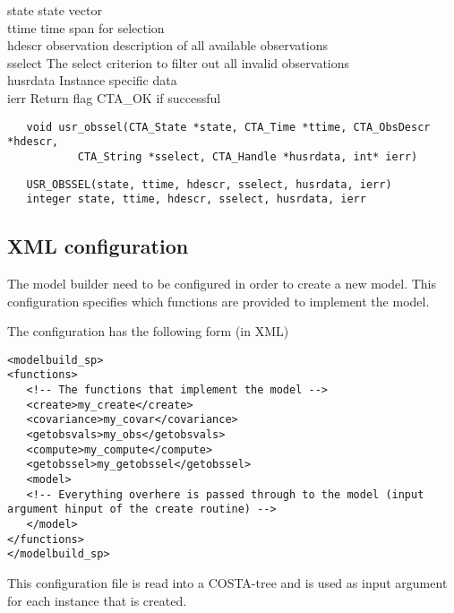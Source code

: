 \horzline
\begin{tabbing}
\functab
{}
 {state}  {state vector} \\
 {ttime}  {time span for selection} \\
 {hdescr} {observation description of all available observations}  \\
 {sselect} {The select criterion to filter out all invalid observations}\\
 {husrdata}  {Instance specific data}\\
    {ierr}      {Return flag CTA\_OK if successful}\\
\end{tabbing}
\horzline

\begin{verbatim}
   void usr_obssel(CTA_State *state, CTA_Time *ttime, CTA_ObsDescr *hdescr,
           CTA_String *sselect, CTA_Handle *husrdata, int* ierr)
\end{verbatim}

\begin{verbatim}
   USR_OBSSEL(state, ttime, hdescr, sselect, husrdata, ierr)
   integer state, ttime, hdescr, sselect, husrdata, ierr
\end{verbatim}

\subsection{XML configuration}
The model builder need to be configured in order to create a new model. This
configuration specifies which functions
are provided to implement the model.

The configuration has the following form (in XML)
\begin{verbatim}
<modelbuild_sp> 
<functions>
   <!-- The functions that implement the model -->
   <create>my_create</create>
   <covariance>my_covar</covariance>
   <getobsvals>my_obs</getobsvals>
   <compute>my_compute</compute>
   <getobssel>my_getobssel</getobssel>
   <model>
   <!-- Everything overhere is passed through to the model (input argument hinput of the create routine) -->
   </model>
</functions>
</modelbuild_sp> 

\end{verbatim}
This configuration file is read into a COSTA-tree and is used as input
argument for each instance that is created.

